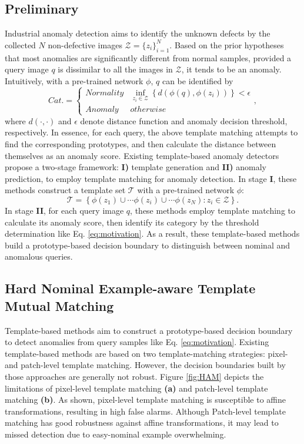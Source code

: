 \documentclass[default,iicol]{sn-jnl}\usepackage[algo2e,ruled,linesnumbered]{algorithm2e}
\theoremstyle{thmstyleone}\newtheorem{theorem}{Theorem}\newtheorem{proposition}[theorem]{Proposition}
\theoremstyle{thmstyletwo}\newtheorem{example}{Example}\newtheorem{remark}{Remark}
\theoremstyle{thmstylethree}\newtheorem{definition}{Definition}
\begin{document}
\subsection{Preliminary}\label{sec:temp_match}
Industrial anomaly detection aims to identify the unknown defects by the collected $N$ non-defective images $\mathcal{Z}=\{z_{i}\}^{N}_{i=1}$.
Based on the prior hypotheses that most anomalies are significantly different from normal samples, provided a query image $q$ is dissimilar to all the images in $\mathcal{Z}$, it tends to be an anomaly.
Intuitively, with a pre-trained network $\phi$, $q$ can be identified by
\begin{equation}
    Cat.\!\!=\!\!
    \begin{cases}
        Normality & \!\!\!\!\inf\limits_{z_{i}\in\mathcal{Z}} \!\left\{d\left(\phi(q), \phi(z_{i})\right)\right\}\! < \!\epsilon \\
        Anomaly & \!\!\!\!otherwise
    \end{cases}\!\!,
    \label{eq:motivation}
\end{equation}
where $d(\cdot, \cdot)$ and $\epsilon$ denote distance function and anomaly decision threshold, respectively.
In essence, for each query, the above template matching attempts to find the corresponding prototypes, and then calculate the distance between themselves as an anomaly score.
Existing template-based anomaly detectors \cite{SPADE,Padim,patchcore} propose a two-stage framework: \textbf{I)} template generation and \textbf{II)} anomaly prediction, to employ template matching for anomaly detection.
In stage \textbf{I}, these methods construct a template set $\mathcal{T}$ with a pre-trained network $\phi$:
\begin{equation}
    \mathcal{T} = \left\{\phi(z_{1})\cup\cdots\phi(z_{i})\cup\cdots\phi(z_{N}): z_{i}\in \mathcal{Z}\right\}.
\end{equation}
In stage \textbf{II}, for each query image $q$, these methods employ template matching to calculate its anomaly score, then identify its category by the threshold determination like Eq. \ref{eq:motivation}.
As a result, these template-based methods build a prototype-based decision boundary to distinguish between nominal and anomalous queries.

\subsection{Hard Nominal Example-aware Template Mutual Matching}\label{sec:HAM}
Template-based methods aim to construct a prototype-based decision boundary to detect anomalies from query samples like Eq. \ref{eq:motivation}.
Existing template-based methods are based on two template-matching strategies: pixel- and patch-level template matching.
However, the decision boundaries built by those approaches are generally not robust.
Figure \ref{fig:HAM} depicts the limitations of pixel-level template matching \textbf{(a)} and patch-level template matching \textbf{(b)}.
As shown, pixel-level template matching is susceptible to affine transformations, resulting in high false alarms.
Although Patch-level template matching has good robustness against affine transformations, it may lead to missed detection due to easy-nominal example overwhelming.
\end{document}
